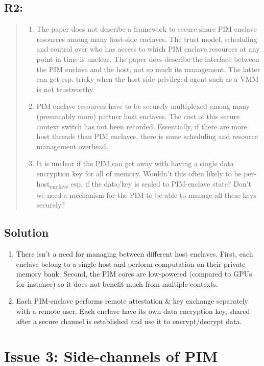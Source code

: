 \documentclass[11pt]{article}
\begin{document}
\subsection{R2:}
\label{sec:orgfe5b8ed}
\begin{quote}
\begin{enumerate}
\item The paper does not describe a framework to secure share PIM enclave resources among many host-side enclaves. The trust model, scheduling and control over who has access to which PIM enclave resources at any point in time is unclear. The paper does describe the interface between the PIM enclave and the host, not so much its management. The latter can get esp. tricky when the host side privileged agent such as a VMM is not trustworthy.
\item PIM enclave resources have to be securely multiplexed among many (presumably more) partner host enclaves. The cost of this secure context switch has not been recorded. Essentially, if there are more host threads than PIM enclaves, there is some scheduling and resource management overhead.
\item It is unclear if the PIM can get away with having a single data encryption key for all of memory. Wouldn't this often likely to be per-host\textsubscript{enclave} esp. if the data/key is sealed to PIM-enclave state? Don't we need a mechanism for the PIM to be able to manage all these keys securely?
\end{enumerate}
\end{quote}
\subsection{Solution}
\label{sec:orgcd18de7}
\begin{enumerate}
\item There isn't a need for managing between different host enclaves. First, each enclave belong to a single host and perform computation on their private memory bank. Second, the PIM cores are low-powered (compared to GPUs for instance) so it does not benefit much from multiple contexts.
\item Each PIM-enclave performs remote attestation \& key exchange separately with a remote user. Each enclave have its own data encryption key, shared after a secure channel is established and use it to encrypt/decrypt data.
\end{enumerate}
\section{Issue 3: Side-channels of PIM}
\label{sec:orgc0bfb6e}
\end{document}
